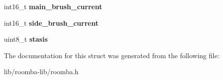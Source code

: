 \begin{DoxyCompactItemize}
\item 
\hypertarget{group__roomba-lib_ga5da7c3a4c8e56bd2e359eec4db31bb59}{}int16\+\_\+t {\bfseries main\+\_\+brush\+\_\+current}\label{group__roomba-lib_ga5da7c3a4c8e56bd2e359eec4db31bb59}

\item 
\hypertarget{group__roomba-lib_ga480d7a16d91c35b29d80f375d618af8f}{}int16\+\_\+t {\bfseries side\+\_\+brush\+\_\+current}\label{group__roomba-lib_ga480d7a16d91c35b29d80f375d618af8f}

\item 
\hypertarget{group__roomba-lib_ga70aafd5ca9d423c9de407f6f3fd1e59d}{}uint8\+\_\+t {\bfseries stasis}\label{group__roomba-lib_ga70aafd5ca9d423c9de407f6f3fd1e59d}

\end{DoxyCompactItemize}


The documentation for this struct was generated from the following file\+:\begin{DoxyCompactItemize}
\item 
lib/roomba-\/lib/roomba.\+h\end{DoxyCompactItemize}
